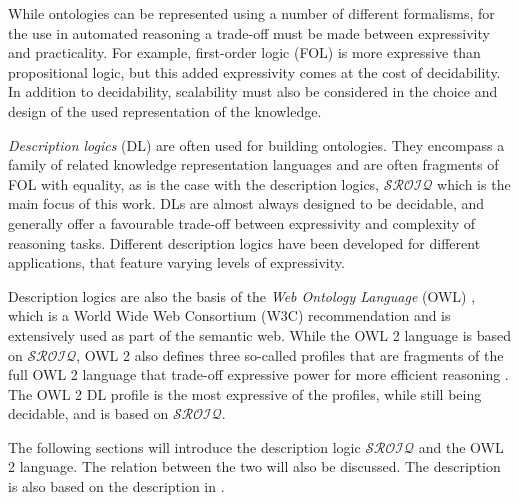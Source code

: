 While ontologies can be represented using a number of different formalisms, for the use in automated reasoning a trade-off must be made between expressivity and practicality. For example, first-order logic (FOL) is more expressive than propositional logic, but this added expressivity comes at the cost of decidability. In addition to decidability, scalability must also be considered in the choice and design of the used representation of the knowledge.

\emph{Description logics} (DL) are often used for building ontologies. They encompass a family of related knowledge representation languages and are often fragments of FOL with equality, as is the case with the description logics, $\mathcal{SROIQ}$ which is the main focus of this work. DLs are almost always designed to be decidable, and generally offer a favourable trade-off between expressivity and complexity of reasoning tasks. Different description logics have been developed for different applications, that feature varying levels of expressivity.

Description logics are also the basis of the \emph{Web Ontology Language} (OWL) \cite{motik2009owl_spec, hitzler2009owl_primer}, which is a World Wide Web Consortium (W3C) recommendation and is extensively used as part of the semantic web. While the OWL 2 language is based on $\mathcal{SROIQ}$, OWL 2 also defines three so-called profiles that are fragments of the full OWL 2 language that trade-off expressive power for more efficient reasoning \cite{motik2009owl_profiles}. The OWL 2 DL profile is the most expressive of the profiles, while still being decidable, and is based on $\mathcal{SROIQ}$.

The following sections will introduce the description logic $\mathcal{SROIQ}$ \cite{horrocks2006even} and the OWL 2 language. The relation between the two will also be discussed. The description is also based on the description in \cite{rudolph2011foundations}.
